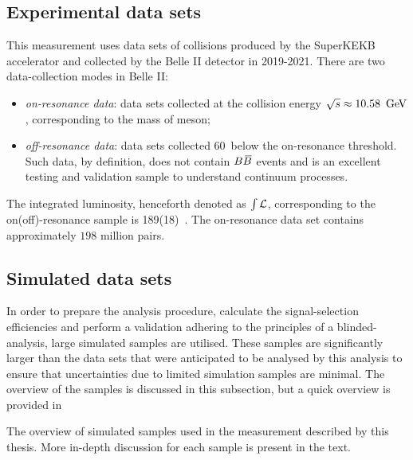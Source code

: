 
\subsection{Experimental data sets}\label{sec:data}

This measurement uses data sets of \epem collisions produced by the SuperKEKB accelerator and collected by the Belle II detector in 2019-2021.
There are two data-collection modes in Belle II:
\begin{itemize}
    \item \textit{on-resonance data}: data sets collected at the collision energy $\sqrt{s}\approx10.58~\mathrm{\,Ge\kern -0.1em V}$, corresponding to the mass of \FourS meson;
    \item \textit{off-resonance data}: data sets collected 60~\mev below the on-resonance threshold. 
    Such data, by definition, does not contain $B\kern 0.18em\overline{\kern -0.18em B}{}$ events and is an excellent testing and validation sample to understand continuum processes.
\end{itemize}
The integrated luminosity, henceforth denoted as $\int~\hspace{-7pt}~\mathcal{L}$, corresponding to the on(off)-resonance sample is 189(18)~\invfb.
The on-resonance data set contains approximately $198$ million \BB pairs.

\subsection{Simulated data sets}\label{sec:MC}

In order to prepare the analysis procedure, calculate the signal-selection efficiencies and perform a validation adhering to the principles of a blinded-analysis, 
large simulated samples are utilised.
These samples are significantly larger than the data sets that were anticipated to be analysed by this analysis to ensure that uncertainties due to limited simulation samples are minimal.
The overview of the samples is discussed in this subsection, but a quick overview is provided in 

\begin{table}[htbp!]
    \centering
\caption{\label{tab:simulated_samples}The overview of simulated samples used in the measurement described by this thesis.
More in-depth discussion for each sample is present in the text.}

\end{table}

